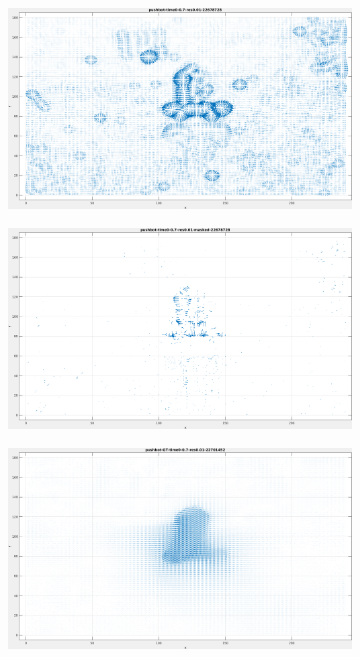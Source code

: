 \begin{figure}[tb]
\centering
\begin{subfigure}{.45\textwidth}
  \centering
  \includegraphics[height=.6\linewidth]{figs/pushbot/pushbot-1.png}
  \caption{}
\end{subfigure}
\begin{subfigure}{.45\textwidth}
  \includegraphics[height=.6\linewidth]{figs/pushbot/pushbot-masked-1.png}
  \caption{}
\end{subfigure}
\begin{subfigure}{.45\textwidth}
  \centering
  \includegraphics[height=.6\linewidth]{figs/pushbot/pushbot-GT-1.png}

\end{subfigure}
\end{figure}
